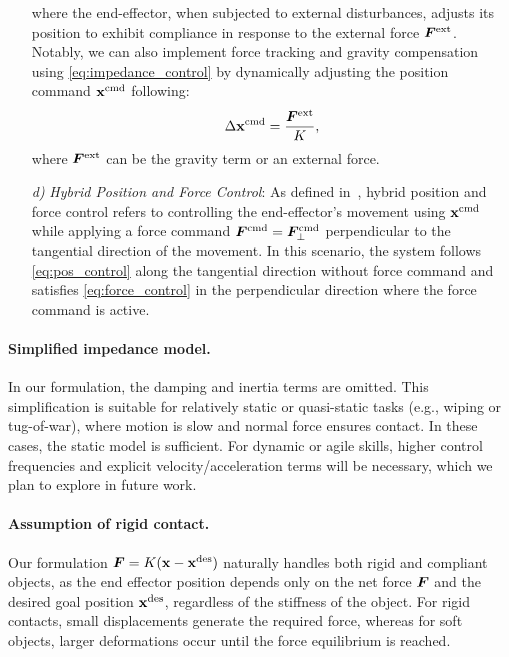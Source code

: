 \documentclass{article}
\begin{document}
\begin{itemize}
{        where the end-effector, when subjected to external disturbances, adjusts its position to exhibit compliance in response to the external force $\mF^{\text{ext}}$. Notably, we can also implement force tracking and gravity compensation using \cref{eq:impedance_control} by dynamically adjusting the position command $\rvx^{\text{cmd}}$ following:
        \begin{equation}
            \Delta \rvx^{\text{cmd}} = \frac{\mF^{\text{ext}}}{K},
            \label{eq:force_tracking}
        \end{equation}
        where $\mF^{\text{ext}}$ can be the gravity term or an external force.
        }
    \item[\textit{d)}] {
        \textit{Hybrid Position and Force Control}: As defined in~\cite{raibert1981hybrid}, hybrid position and force control refers to controlling the end-effector's movement using $\rvx^{\text{cmd}}$ while applying a force command ${\bm{F}}^{\text{cmd}} = {\bm{F}}^{\text{cmd}}_{\perp}$ perpendicular to the tangential direction of the movement. In this scenario, the system follows \cref{eq:pos_control} along the tangential direction without force command and satisfies \cref{eq:force_control} in the perpendicular direction where the force command is active.
    }
\end{itemize}

\paragraph{Simplified impedance model.}In our formulation, the damping and inertia terms are omitted. This simplification is suitable for relatively static or quasi-static tasks (e.g., wiping or tug-of-war), where motion is slow and normal force ensures contact. In these cases, the static model is sufficient. For dynamic or agile skills, higher control frequencies and explicit velocity/acceleration terms will be necessary, which we plan to explore in future work.

\paragraph{Assumption of rigid contact.}Our formulation \({\bm{F}} = K({\mathbf{x}} - {\mathbf{x}}^{\text{des}})\) naturally handles both rigid and compliant objects, as the end effector position depends only on the net force ${\bm{F}}$ and the desired goal position ${\mathbf{x}}^{\text{des}}$, regardless of the stiffness of the object. For rigid contacts, small displacements generate the required force, whereas for soft objects, larger deformations occur until the force equilibrium is reached.
\end{document}

